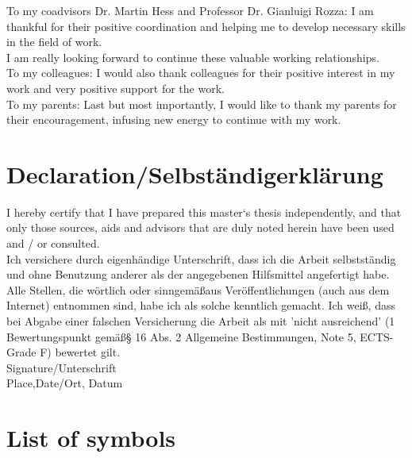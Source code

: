 \documentclass[a4paper]{book}
\begin{document}
To my coadvisors Dr. Martin Hess and Professor Dr. Gianluigi Rozza: I am thankful for their positive coordination and helping me to develop necessary skills in the field of work. \\

I am really looking forward to continue these valuable working relationships.\\

To my colleagues: I would also thank colleagues for their positive interest in my work and very positive support for the work.\\

To my parents:  Last but most importantly, I would like to thank my parents for their encouragement, infusing new energy to continue with my work.

\newpage

\section{Declaration/Selbst\"andigerkl\"arung}

I hereby certify that I have prepared this master‘s thesis independently, and that only those sources, aids and advisors that are duly noted herein have been used and / or consulted.\\

Ich  versichere  durch  eigenhändige  Unterschrift,  dass  ich  die  Arbeit  selbstst\"andig  und  ohne  
Benutzung  anderer  als  der  angegebenen  Hilfsmittel  angefertigt  habe.  Alle  Stellen,  die  
w\"ortlich  oder  sinngem\"a\ss  aus  Ver\"offentlichungen  (auch  aus  dem  Internet)  entnommen  sind,  
habe   ich   als   solche   kenntlich   gemacht.   Ich   wei\ss,   dass   bei   Abgabe   einer   falschen   
Versicherung  die  Arbeit  als  mit  'nicht  ausreichend'  (1  Bewertungspunkt  gem\"a\ss  §  16  Abs.  2  
Allgemeine Bestimmungen, Note 5, ECTS-Grade F) bewertet gilt.\\


Signature/Unterschrift\\

Place,Date/Ort, Datum

\newenvironment{spmatrix}[1]
 {\def\mysubscript{#1}\mathop\bgroup\begin{pmatrix}}
 {\end{pmatrix}\egroup_{\textstyle\mathstrut\mysubscript}}

\section{List of symbols} \label{symbol_list}
\end{document}
